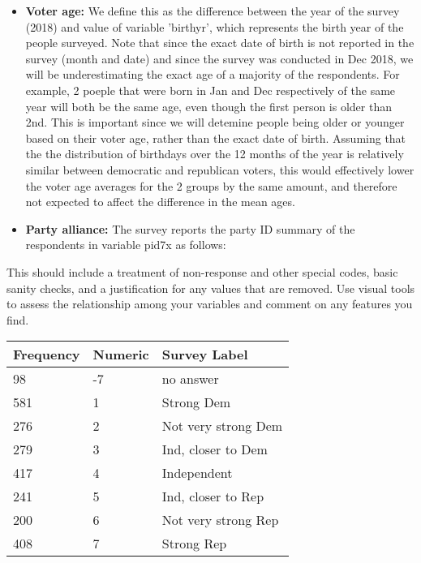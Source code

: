 \documentclass[12pt]{article}
\begin{document}
\begin{itemize}
\item \textbf{Voter age:} We define this as the difference between the year of the survey (2018) and value of variable 'birthyr', which represents the birth year of the people surveyed. Note that since the exact date of birth is not reported in the survey (month and date) and since the survey was conducted in Dec 2018, we will be underestimating the exact age of a majority of the respondents. For example, 2 poeple that were born in Jan and Dec respectively of the same year will both be the same age, even though the first person is older than 2nd. This is important since we will detemine people being older or younger based on their voter age, rather than the exact date of birth. Assuming that the the distribution of birthdays over the 12 months of the year is relatively similar between democratic and republican voters, this would effectively lower the voter age averages for the 2 groups by the same amount, and therefore not expected to affect the difference in the mean ages.
\item \textbf{Party alliance:} The survey reports the party ID summary of the respondents in variable pid7x as follows:
\end{itemize}

This should include a treatment of non-response and other special codes, basic sanity checks, and a justification for any values that are removed. Use visual tools to assess the relationship among your variables and comment on any features you find.

\begin{table}[H]
    \centering
    \begin{tabular}{|l|l|l|}
    \hline
        Frequency & Numeric & Survey Label \\ \hline
        98 & -7 & no answer \\ \hline
        581 & 1 & Strong Dem \\ \hline
        276 & 2 & Not very strong Dem \\ \hline
        279 & 3 & Ind, closer to Dem \\ \hline
        417 & 4 & Independent \\ \hline
        241 & 5 & Ind, closer to Rep \\ \hline
        200 & 6 & Not very strong Rep \\ \hline
        408 & 7 & Strong Rep \\ \hline
    \end{tabular}
\end{table}
\end{document}
